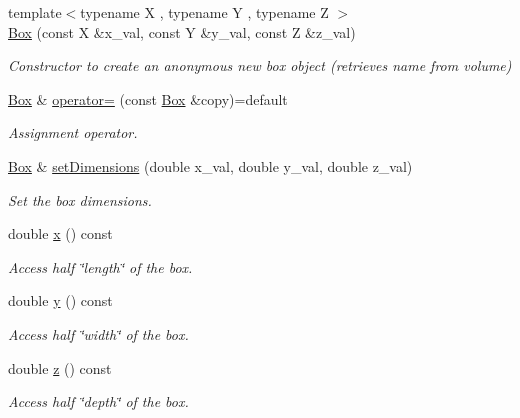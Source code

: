 \begin{DoxyCompactItemize}
{\footnotesize template$<$typename X , typename Y , typename Z $>$ }\\\hyperlink{class_d_d4hep_1_1_geometry_1_1_box_aea21fe484b6c60ed5890b3c3d8b926bd}{Box} (const X \&x\+\_\+val, const Y \&y\+\_\+val, const Z \&z\+\_\+val)
\begin{DoxyCompactList}\small\item\em Constructor to create an anonymous new box object (retrieves name from volume) \end{DoxyCompactList}\item 
\hyperlink{class_d_d4hep_1_1_geometry_1_1_box}{Box} \& \hyperlink{class_d_d4hep_1_1_geometry_1_1_box_a5f0ffbf8b4ebdc308349b96c4fa65018}{operator=} (const \hyperlink{class_d_d4hep_1_1_geometry_1_1_box}{Box} \&copy)=default
\begin{DoxyCompactList}\small\item\em Assignment operator. \end{DoxyCompactList}\item 
\hyperlink{class_d_d4hep_1_1_geometry_1_1_box}{Box} \& \hyperlink{class_d_d4hep_1_1_geometry_1_1_box_aa747479d055c62966ac21ac49355a2dc}{set\+Dimensions} (double x\+\_\+val, double y\+\_\+val, double z\+\_\+val)
\begin{DoxyCompactList}\small\item\em Set the box dimensions. \end{DoxyCompactList}\item 
double \hyperlink{class_d_d4hep_1_1_geometry_1_1_box_a2310c0fb4f075b495ea5698dc59f2f69}{x} () const
\begin{DoxyCompactList}\small\item\em Access half \char`\"{}length\char`\"{} of the box. \end{DoxyCompactList}\item 
double \hyperlink{class_d_d4hep_1_1_geometry_1_1_box_ac0d32d681fbbbe93c01d4bc349d79894}{y} () const
\begin{DoxyCompactList}\small\item\em Access half \char`\"{}width\char`\"{} of the box. \end{DoxyCompactList}\item 
double \hyperlink{class_d_d4hep_1_1_geometry_1_1_box_acbe9b177de87314106387e7781bf7c32}{z} () const
\begin{DoxyCompactList}\small\item\em Access half \char`\"{}depth\char`\"{} of the box. \end{DoxyCompactList}\end{DoxyCompactItemize}
